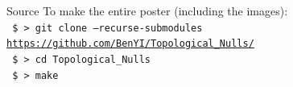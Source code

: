 \documentclass[final]{beamer}
\newlength{\sepwid}
\newlength{\onecolwid}
\newlength{\twocolwid}
\begin{document}
\begin{frame}[t]
\begin{columns}[t]
\begin{column}{\twocolwid}
\begin{columns}[t,totalwidth=\twocolwid]
\begin{column}{\onecolwid}
\begin{block}{Source}
    To make the entire poster (including the images):\\
\texttt{
	\$ > git clone --recurse-submodules  \url{https://github.com/BenYI/Topological_Nulls/}}\\
\texttt{
    \$ > cd Topological\_Nulls\\
  }
\texttt{
    \$ > make
  }


\end{block}
\end{column}
\end{columns}

\end{column}
\begin{column}{\sepwid}\end{column} %


\end{columns} %

\end{frame} %
\end{document}
